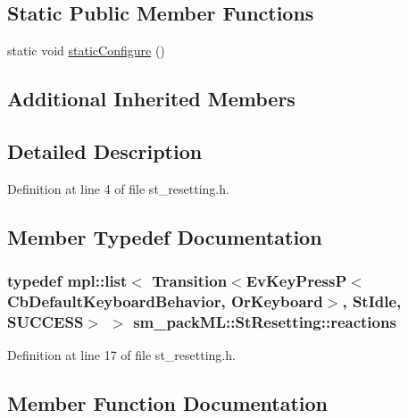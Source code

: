 \subsection*{Static Public Member Functions}
\begin{DoxyCompactItemize}
\item 
static void \hyperlink{structsm__packML_1_1StResetting_a4c1f24d4cab96fd914b31e41c21ab98e}{static\+Configure} ()
\end{DoxyCompactItemize}
\subsection*{Additional Inherited Members}


\subsection{Detailed Description}


Definition at line 4 of file st\+\_\+resetting.\+h.



\subsection{Member Typedef Documentation}
\subsubsection[{\texorpdfstring{reactions}{reactions}}]{\setlength{\rightskip}{0pt plus 5cm}typedef mpl\+::list$<$ Transition$<$Ev\+Key\+PressP$<$Cb\+Default\+Keyboard\+Behavior, {\bf Or\+Keyboard}$>$, {\bf St\+Idle}, {\bf S\+U\+C\+C\+E\+SS}$>$ $>$ {\bf sm\+\_\+pack\+M\+L\+::\+St\+Resetting\+::reactions}}\hypertarget{structsm__packML_1_1StResetting_adb5a25459b59cd84a9912fde9282395c}{}\label{structsm__packML_1_1StResetting_adb5a25459b59cd84a9912fde9282395c}


Definition at line 17 of file st\+\_\+resetting.\+h.



\subsection{Member Function Documentation}
